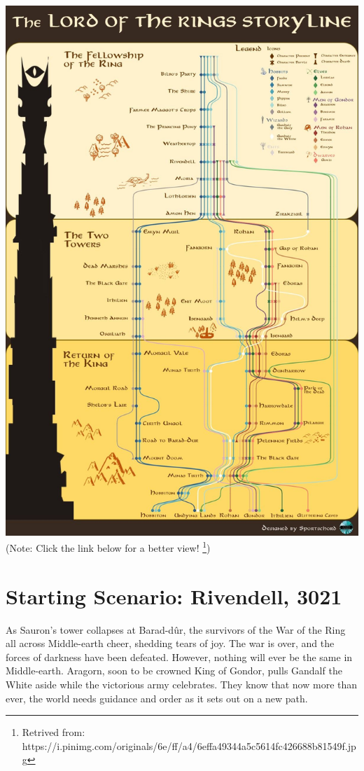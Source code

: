 \documentclass[10pt, letterpaper]{article}
\begin{document}
\begin{center}
      \includegraphics[scale = 0.3]{image1.png}\\
(Note: Click the link below for a better view! \footnote{Retrived from: https://i.pinimg.com/originals/6e/ff/a4/6effa49344a5c5614fc426688b81549f.jpg})
\end{center}

\newpage

\section{Starting Scenario: Rivendell, 3021}
\noindent As Sauron’s tower collapses at Barad-dûr, the survivors of the War of the Ring all across Middle-earth cheer, shedding tears of joy. The war is over, and the forces of darkness have been defeated. However, nothing will ever be the same in Middle-earth. Aragorn, soon to be crowned King of Gondor, pulls Gandalf the White aside while the victorious army celebrates. They know that now more than ever, the world needs guidance and order as it sets out on a new path. \\
\end{document}
